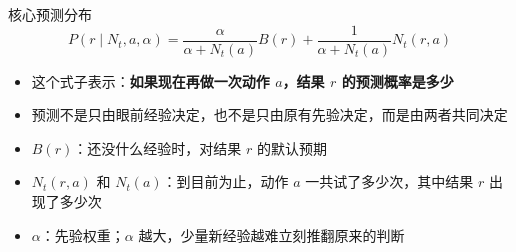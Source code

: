 \documentclass[aspectratio=169]{beamer}
\begin{document}
\begin{frame}[c]{核心预测分布}
\scriptsize
\centering
\[
P(r\mid N_t,a,\alpha)
=
\frac{\alpha}{\alpha+N_t(a)}B(r)
+
\frac{1}{\alpha+N_t(a)}N_t(r,a)
\]

\vspace{0.1cm}
\begin{minipage}{0.84\textwidth}
\begin{itemize}
    \item 这个式子表示：\textbf{如果现在再做一次动作 \(a\)，结果 \(r\) 的预测概率是多少}
    \item 预测不是只由眼前经验决定，也不是只由原有先验决定，而是由两者共同决定
    \item \(B(r)\)：还没什么经验时，对结果 \(r\) 的默认预期
    \item \(N_t(r,a)\) 和 \(N_t(a)\)：到目前为止，动作 \(a\) 一共试了多少次，其中结果 \(r\) 出现了多少次
    \item \(\alpha\)：先验权重；\(\alpha\) 越大，少量新经验越难立刻推翻原来的判断
\end{itemize}
\end{minipage}
\end{frame}
\end{document}
